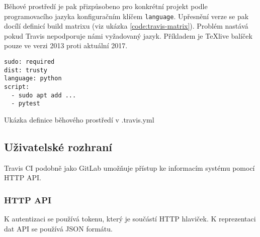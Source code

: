 Běhové prostředí je pak přizpůsobeno pro konkrétní projekt podle programovacího jazyka konfiguračním klíčem \verb|language|.
Upřesnění verze se pak docílí definicí build matrixu (viz ukázka \ref{code:travis-matrix}).
Problém nastává pokud Travis nepodporuje námi vyžadovaný jazyk.
Příkladem je \TeX{}live balíček pouze ve verzi 2013 proti aktuální 2017.

\begin{listing}[ht]
\begin{verbatim}
sudo: required
dist: trusty
language: python
script:
  - sudo apt add ...
  - pytest
\end{verbatim}
\caption{Ukázka definice běhového prostředí v .travis.yml}
\end{listing}

\subsection{Uživatelské rozhraní}

Travis CI podobně jako GitLab umožňuje přístup ke informacím systému pomocí HTTP API.

\subsubsection{HTTP API}

K autentizaci se používá tokenu, který je součástí HTTP hlaviček.
K reprezentaci dat API se používá JSON formátu.

